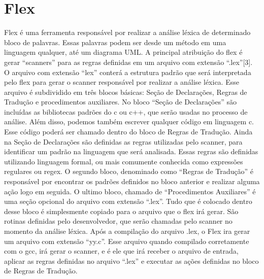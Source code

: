 \section{Flex}
Flex é uma ferramenta responsável por realizar a análise léxica de determinado bloco de palavras. Essas palavras podem ser desde um método em uma linguagem qualquer, até um diagrama UML. A principal atribuição do flex é gerar  “scanners” para as regras definidas em um arquivo com extensão “.lex”[3]. 
O arquivo com extensão “lex” conterá a estrutura padrão que será interpretada pelo flex para gerar o scanner responsável por realizar a análise léxica. Esse arquivo é subdividido em três blocos básicas: Seção de Declarações, Regras de Tradução e procedimentos auxiliares.
No bloco “Seção de Declarações” são incluídas as bibliotecas padrões do c ou c++, que serão usadas no processo de análise. Além disso, podemos também escrever qualquer código em linguagem c. Esse código poderá ser chamado dentro do bloco de Regras de Tradução.
Ainda na Seção de Declarações são definidas as regras utilizadas pelo scanner, para identificar um padrão na linguagem que será analisada.  Essas regras são definidas utilizando linguagem formal, ou mais comumente conhecida como expressões regulares ou regex.
O segundo bloco, denominado como “Regras de Tradução” é responsável por encontrar os padrões definidos no bloco anterior e realizar alguma ação logo em seguida.
O ultimo bloco, chamado de “Procedimentos Auxiliares” é uma seção opcional do arquivo com extensão “.lex”. Tudo que é colocado dentro desse bloco é simplesmente copiado para o arquivo que o flex irá gerar.  São rotinas definidas pelo desenvolvedor, que serão chamadas pelo scanner no momento da análise léxica.
Após a compilação do arquivo .lex, o Flex ira gerar um arquivo com extensão “yy.c”. Esse arquivo quando compilado corretamente com o gcc, irá gerar o scanner, e é ele que irá receber o arquivo de entrada, aplicar as regras definidas no arquivo “.lex” e executar as ações definidas no bloco de Regras de Tradução.


